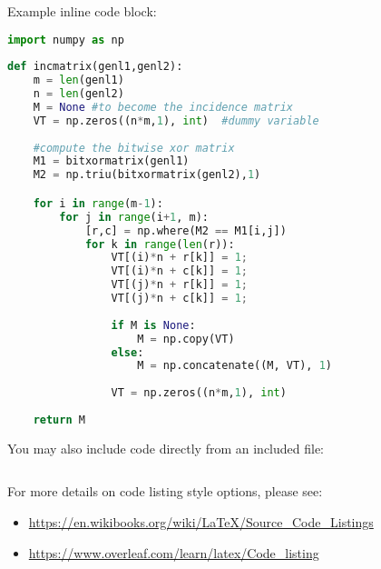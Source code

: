 \documentclass{article}
\begin{document}
Example inline code block:
\begin{lstlisting}[language=Python, caption=Python example]
import numpy as np
    
def incmatrix(genl1,genl2):
    m = len(genl1)
    n = len(genl2)
    M = None #to become the incidence matrix
    VT = np.zeros((n*m,1), int)  #dummy variable
    
    #compute the bitwise xor matrix
    M1 = bitxormatrix(genl1)
    M2 = np.triu(bitxormatrix(genl2),1) 

    for i in range(m-1):
        for j in range(i+1, m):
            [r,c] = np.where(M2 == M1[i,j])
            for k in range(len(r)):
                VT[(i)*n + r[k]] = 1;
                VT[(i)*n + c[k]] = 1;
                VT[(j)*n + r[k]] = 1;
                VT[(j)*n + c[k]] = 1;
                
                if M is None:
                    M = np.copy(VT)
                else:
                    M = np.concatenate((M, VT), 1)
                
                VT = np.zeros((n*m,1), int)
    
    return M
\end{lstlisting}

You may also include code directly from an included file: 
\begin{lstlisting}

\end{lstlisting}

For more details on code listing style options, please see:
\begin{itemize}
    \item \url{https://en.wikibooks.org/wiki/LaTeX/Source\_Code\_Listings}
    \item \url{https://www.overleaf.com/learn/latex/Code\_listing}
\end{itemize}
\end{document}
